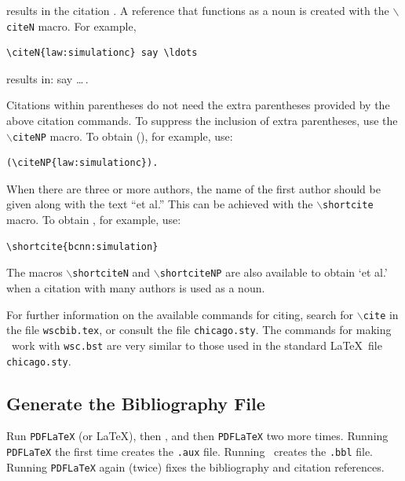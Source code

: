 \documentclass{wscpaperproc}
\theoremstyle{wsc}
\begin{document}
\noindent results in the citation \cite{cheng:input94,law:simulationc}. A reference that functions as a noun is created with the {\tt $\backslash$citeN}
macro. For example,\newline


\begin{verbatim}
\citeN{law:simulationc} say \ldots
\end{verbatim}\vspace{5mm}

\noindent results in:  say \ldots\,.

Citations within parentheses do not need the extra parentheses provided by the above citation commands. To suppress the inclusion of extra parentheses, use the {\tt $\backslash$citeNP} macro. To obtain (), for example, use:\newline


\begin{verbatim}
(\citeNP{law:simulationc}).
\end{verbatim}\vspace{5mm}

When there are three or more authors, the name of the first author should be given along with the text ``et al.'' This can be achieved with the {\tt $\backslash$shortcite} macro. To obtain , for example, use: \newline


\begin{verbatim}
\shortcite{bcnn:simulation}
\end{verbatim}\vspace{5mm}

\noindent The macros {\tt $\backslash$shortciteN} and {\tt $\backslash$shortciteNP} are also available to obtain `et al.' when a citation with many authors is used as a noun.

For further information on the available commands for citing, search for {\tt $\backslash$cite} in the file {\tt wscbib.tex}, or consult the file {\tt chicago.sty}. The commands for making \BibTeX\ work with {\tt wsc.bst} are very similar to those used in the standard \LaTeX\ file {\tt chicago.sty}.

\subsection{Generate the Bibliography File}

Run {\tt PDFLaTeX} (or \LaTeX), then \BibTeX, and then {\tt PDFLaTeX} two more times. Running {\tt PDFLaTeX} the first time creates the \texttt{.aux} file. Running \BibTeX\ creates the {\tt .bbl} file. Running {\tt PDFLaTeX} again (twice) fixes the bibliography and citation references.
\end{document}
